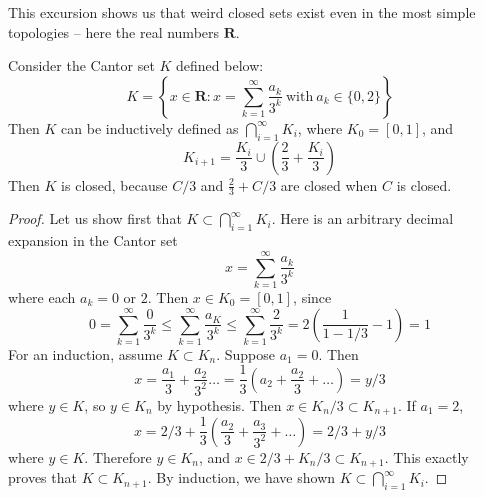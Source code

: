 This excursion shows us that weird closed sets exist even in the most simple topologies -- here the real numbers $\mathbf{R}$.

\begin{example}
    Consider the Cantor set $K$ defined below:
    \[ K = \left\{ x \in \mathbf{R} : x = \sum_{k = 1}^\infty \frac{a_k}{3^k} \ \text{with}\ a_k \in \{0,2 \} \right\} \]
    Then $K$ can be inductively defined as $\bigcap_{i = 1}^\infty K_i$, where $K_0 = [0,1]$, and
    \[ K_{i+1} = \frac{K_i}{3} \cup \left(\frac{2}{3} + \frac{K_i}{3}\right) \]
    Then $K$ is closed, because $C/3$ and $\frac{2}{3} + C/3$ are closed when $C$ is closed.
\end{example}
\begin{proof}
    Let us show first that $K \subset \bigcap_{i = 1}^\infty K_i$. Here is an arbitrary decimal expansion in the Cantor set
    \[ x = \sum_{k = 1}^\infty \frac{a_k}{3^k} \]
    where each $a_k = 0$ or $2$. Then $x \in K_0 = [0,1]$, since
    \[ 0 = \sum_{k = 1}^\infty \frac{0}{3^k} \leq \sum_{k = 1}^\infty \frac{a_K}{3^k} \leq \sum_{k = 1}^\infty \frac{2}{3^k} = 2(\frac{1}{1 - 1/3} - 1) = 1 \]
    For an induction, assume $K \subset K_n$. Suppose $a_1 = 0$. Then
    \[ x = \frac{a_1}{3} + \frac{a_2}{3^2} \dots = \frac{1}{3} (a_2 + \frac{a_2}{3} + \dots) = y/3 \]
    where $y \in K$, so $y \in K_n$ by hypothesis. Then $x \in K_n/3 \subset K_{n+1}$. If $a_1 = 2$,
    \[ x = 2/3 + \frac{1}{3}(\frac{a_2}{3} + \frac{a_3}{3^2} + \dots) = 2/3 + y/3 \]
    where $y \in K$. Therefore $y \in K_n$, and $x \in 2/3 + K_n/3 \subset K_{n+1}$. This exactly proves that $K \subset K_{n + 1}$. By induction, we have shown $K \subset \bigcap_{i = 1}^\infty K_i$.


\end{proof}
